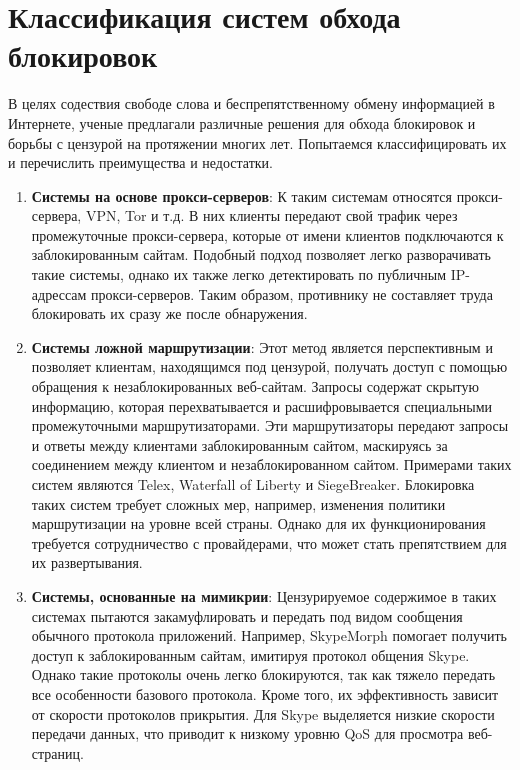 \section{Классификация систем обхода блокировок}
В целях содествия свободе слова и беспрепятственному обмену информацией в Интернете,
ученые предлагали различные решения для обхода блокировок и борьбы с цензурой на протяжении многих лет.
Попытаемся классифицировать их и перечислить преимущества и недостатки.

\begin{enumerate}

    \item \textbf{Системы на основе прокси-серверов}: К таким системам относятся прокси-сервера, VPN, Tor и т.д.
    В них клиенты передают свой трафик через промежуточные прокси-сервера, которые от имени клиентов подключаются к заблокированным сайтам.
    Подобный подход позволяет легко разворачивать такие системы, однако их также легко детектировать по публичным IP-адрессам прокси-серверов.
    Таким образом, противнику не составляет труда блокировать их сразу же после обнаружения.

    \item \textbf{Системы ложной маршрутизации}:
    Этот метод является перспективным и позволяет клиентам, находящимся под цензурой, получать доступ с помощью обращения к незаблокированных веб-сайтам.
    Запросы содержат скрытую информацию, которая перехватывается и расшифровывается специальными промежуточными маршрутизаторами.
    Эти маршрутизаторы передают запросы и ответы между клиентами заблокированным сайтом, маскируясь за соединением между клиентом и незаблокированном сайтом.
    Примерами таких систем являются Telex, Waterfall of Liberty и SiegeBreaker.
    Блокировка таких систем требует сложных мер, например, изменения политики маршрутизации на уровне всей страны.
    Однако для их функционирования требуется сотрудничество с провайдерами, что может стать препятствием для их развертывания.

    \item \textbf{Системы, основанные на мимикрии}:
    Цензурируемое содержимое в таких системах пытаются закамуфлировать и передать под видом сообщения обычного протокола приложений.
    Например, SkypeMorph помогает получить доступ к заблокированным сайтам, имитируя протокол общения Skype.
    Однако такие протоколы очень легко блокируются, так как тяжело передать все особенности базового протокола.
    Кроме того, их эффективность зависит от скорости протоколов прикрытия. Для Skype выделяется низкие скорости передачи данных,
    что приводит к низкому уровню QoS для просмотра веб-страниц.


\end{enumerate}
